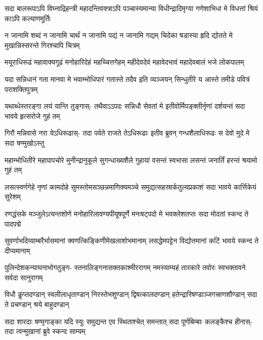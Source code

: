 
\fourlineindentedshloka
{सदा बालरूपाऽपि विघ्नाद्रिहन्त्री}
{महादन्तिवक्त्राऽपि पञ्चास्यमान्या}
{विधीन्द्रादिमृग्या गणेशाभिधा मे}
{विधत्तां श्रियं काऽपि कल्याणमूर्तिः}

\fourlineindentedshloka
{न जानामि शब्दं न जानामि चार्थं}
{न जानामि पद्यं न जानामि गद्यम्}
{चिदेका षडास्या हृदि द्योतते मे}
{मुखान्निस्सरन्ते गिरश्चापि चित्रम्}

\fourlineindentedshloka
{मयूराधिरूढं महावाक्यगूढं}
{मनोहारिदेहं महच्चित्तगेहम्}
{महीदेवदेवं महावेदभावं}
{महादेवबालं भजे लोकपालम्}

\fourlineindentedshloka
{यदा सन्निधानं गता मानवा मे}
{भवाम्भोधिपारं गतास्ते तदैव}
{इति व्यञ्जयन् सिन्धुतीरे य आस्ते}
{तमीडे पवित्रं पराशक्तिपुत्रम्}

\fourlineindentedshloka
{यथाब्धेस्तरङ्गा लयं यान्ति तुङ्गास्-}
{तथैवाऽऽपदः सन्निधौ सेवतां मे}
{इतीवोर्मिपङ्क्तीर्नृणां दर्शयन्तं}
{सदा भावये हृत्सरोजे गुहं तम्}

\fourlineindentedshloka
{गिरौ मन्निवासे नरा येऽधिरूढास्-}
{तदा पर्वते राजते तेऽधिरूढाः}
{इतीव ब्रुवन् गन्धशैलाधिरूढः}
{स देवो मुदे मे सदा षण्मुखोऽस्तु}

\fourlineindentedshloka
{महाम्भोधितीरे महापापचोरे}
{मुनीन्द्रानुकूले सुगन्धाख्यशैले}
{गुहायां वसन्तं स्वभासा लसन्तं}
{जनार्तिं हरन्तं श्रयामो गुहं तम्}

\fourlineindentedshloka
{लसत्स्वर्णगेहे नृणां कामदोहे}
{सुमस्तोमसञ्छन्नमाणिक्यमञ्चे}
{समुद्यत्सहस्रार्कतुल्यप्रकाशं}
{सदा भावये कार्त्तिकेयं सुरेशम्}

\fourlineindentedshloka
{रणद्धंसके मञ्जुलेऽत्यन्तशोणे}
{मनोहारिलावण्यपीयूषपूर्णे}
{मनःषट्पदो मे भवक्लेशतप्तः}
{सदा मोदतां स्कन्द ते पादपद्मे}

\fourlineindentedshloka
{सुवर्णाभदिव्याम्बरैर्भासमानां}
{क्वणत्किङ्किणीमेखलाशोभमानाम्}
{लसद्धेमपट्टेन विद्योतमानां}
{कटिं भावये स्कन्द ते दीप्यमानाम्}

\fourlineindentedshloka
{पुलिन्देशकन्याघनाभोगतुङ्ग-}
{स्तनालिङ्गनासक्तकाश्मीररागम्}
{नमस्याम्यहं तारकारे तवोरः}
{स्वभक्तावने सर्वदा सानुरागम्}

\fourlineindentedshloka
{विधौ कॢप्तदण्डान् स्वलीलाधृताण्डान्}
{निरस्तेभशुण्डान् द्विषत्कालदण्डान्}
{हतेन्द्रारिषण्डाञ्जगत्त्राणशौण्डान्}
{सदा ते प्रचण्डान् श्रये बाहुदण्डान्}

\fourlineindentedshloka
{सदा शारदाः षण्मृगाङ्का यदि स्युः}
{समुद्यन्त एव स्थिताश्चेत् समन्तात्}
{सदा पूर्णबिम्बाः कलङ्कैश्च हीनास्-}
{तदा त्वन्मुखानां ब्रुवे स्कन्द साम्यम्}

